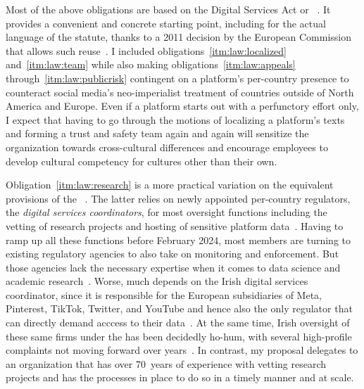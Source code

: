 Most of the above obligations are based on the Digital Services Act or
~\cite{EuropeanParliamentAndCouncil2022}. It provides a convenient and
concrete starting point, including for the actual language of the statute,
thanks to a 2011 decision by the European Commission that allows such
reuse~\cite{EuropeanCommission2011}. I included
obligations~\ref{itm:law:localized} and~\ref{itm:law:team} while also making
obligations~\ref{itm:law:appeals} through~\ref{itm:law:publicrisk} contingent on
a platform's per-country presence to counteract social media's neo-imperialist
treatment of countries outside of North America and Europe. Even if a platform
starts out with a perfunctory effort only, I expect that having to go through the
motions of localizing a platform's texts and forming a trust and safety team
again and again will sensitize the organization towards cross-cultural differences
and encourage employees to develop cultural competency for cultures other than
their own.

Obligation~\ref{itm:law:research} is a more practical variation on the
equivalent provisions of the ~\cite{Vermeulen2022}. The latter relies on
newly appointed per-country regulators, the \emph{digital services
coordinators}, for most oversight functions including the vetting of research
projects and hosting of sensitive platform data~\cite{Jaursch2022,Jaursch2022a}.
Having to ramp up all these functions before February 2024, most  members
are turning to existing regulatory agencies to also take on  monitoring and
enforcement. But those agencies lack the necessary expertise when it comes to
data science and academic research~\cite{Jaursch2023}. Worse, much depends on
the Irish digital services coordinator, since it is responsible for the European
subsidiaries of Meta, Pinterest, TikTok, Twitter, and YouTube and hence also the
only regulator that can directly demand acccess to their
data~\cite{Albert2022,Jaursch2023}. At the same time, Irish oversight of these
same firms under the  has been decidedly ho-hum, with several
high-profile complaints not moving forward over years~\cite{Burgess2022}. In
contrast, my proposal delegates to an organization that has over 70~years of
experience with vetting research projects and has the processes in place to do
so in a timely manner and at scale.


